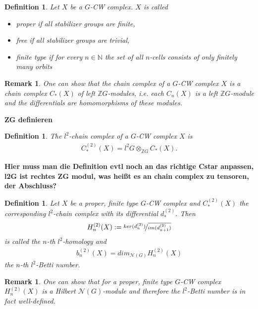 \documentclass[12pt,a4paper]{scrartcl}
\newtheorem{Definition}[Theorem]{Definition}
\newtheorem{Remark}[Theorem]{Remark}
\numberwithin{equation}{section}
\newcommand{\Z}{\mathbb{Z}} %
\newcommand{\N}{\mathbb{N}} %
\newcommand{\2}{\mathbb{Z} / 2 \mathbb{Z}}
\newcommand{\1}{\overline{1}}
\newcommand{\0}{\overline{0}}
\begin{document}
\begin{Definition}
	Let $X$ be a $G$-CW complex. $X$ is called
	\begin{itemize}
		\item proper if all stabilizer groups are finite,
		\item free if all stabilizer groups are trivial,
		\item finite type if for every $n \in \N$ the set of all $n$-cells consists of only finitely many orbits
	\end{itemize}
\end{Definition}
\begin{Remark}
	One can show that the chain complex of a $G$-CW complex $X$ is a chain complex $C_*(X)$ of left $\Z G$-modules, i.e. each $C_n(X)$ is a left $\Z G$-module and the differentials are homomorphisms of these modules.
\end{Remark}
\textbf{ZG definieren}
\begin{Definition}
	The $l^2$-chain complex of a $G$-CW complex $X$ is
	\begin{align*}
		C_*^{(2)}(X) = l^2G \otimes_{\Z G} C_*(X).
	\end{align*}
\end{Definition}
\textbf{Hier muss man die Definition evtl noch an das richtige Cstar anpassen, l2G ist rechtes ZG modul, was heißt es an chain complex zu tensoren, der Abschluss?}

\begin{Definition}
	Let $X$ be a proper, finite type $G$-CW complex and $C_*^{(2)}(X)$ the corresponding $l^2$-chain complex with its differential $d_*^{(2)}$. Then 
	\begin{align*}
		H_n^{(2)}(X) := \nicefrac{ker(d_n^{(2)})}{\overline{im(d_{n+1}^{(2)})}}
	\end{align*}
	is called the $n$-th $l^2$-homology and 
	\begin{align*}
		b_n^{(2)}(X)=dim_{\mathcal{N}(G)}H_n^{(2)}(X)
	\end{align*}
	the $n$-th $l^2$-Betti number.
\end{Definition}
\begin{Remark}
	\label{MAB}
	One can show that for a proper, finite type $G$-CW complex $H_n^{(2)}(X)$ is a Hilbert $\mathcal{N}(G)$-module and therefore the $l^2$-Betti number is in fact well-defined.
\end{Remark}
\end{document}
